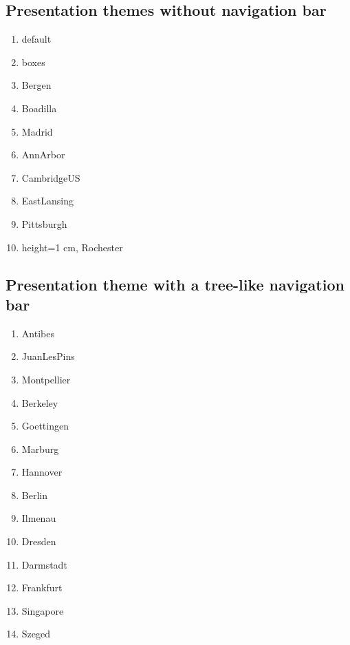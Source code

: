 \documentclass[10 pt]{book}
\begin{document}
\subsection{Presentation themes without navigation bar}
\begin{enumerate}
 \item default
 \item boxes
 \item Bergen
 \item Boadilla
 \item Madrid
 \item AnnArbor
 \item CambridgeUS
 \item EastLansing
 \item Pittsburgh
 \item height=1 cm, Rochester
\end{enumerate}

\subsection{Presentation theme with a tree-like navigation bar}
\begin{enumerate}
 \item Antibes
 \item JuanLesPins
 \item Montpellier
 \item Berkeley
 \item Goettingen
 \item Marburg
 \item Hannover
 \item Berlin
 \item Ilmenau
 \item Dresden
 \item Darmstadt
 \item Frankfurt
 \item Singapore
 \item Szeged
\end{enumerate}
\end{document}
